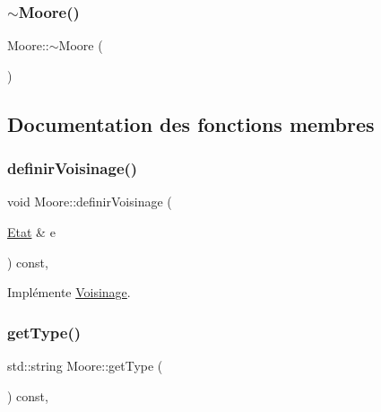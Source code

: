 \mbox{\label{class_moore_a18c2281db2524fff1559b5861cd2e3dc}} 
\subsubsection{\texorpdfstring{$\sim$\+Moore()}{~Moore()}}
{\footnotesize\ttfamily Moore\+::$\sim$\+Moore (\begin{DoxyParamCaption}{ }\end{DoxyParamCaption})\hspace{0.3cm}{\ttfamily [default]}}



\subsection{Documentation des fonctions membres}
\mbox{\label{class_moore_a29a0a8f7b132429b5cbea4fdafcfd045}} 
\subsubsection{\texorpdfstring{definir\+Voisinage()}{definirVoisinage()}}
{\footnotesize\ttfamily void Moore\+::definir\+Voisinage (\begin{DoxyParamCaption}\item[{\mbox{\hyperlink{class_etat}{Etat}} \&}]{e }\end{DoxyParamCaption}) const\hspace{0.3cm}{\ttfamily [override]}, {\ttfamily [virtual]}}



Implémente \mbox{\hyperlink{class_voisinage_ac12f70bf8e971cbc8eaf8394de270d07}{Voisinage}}.

\mbox{\label{class_moore_af0398509c1540f611c000579714fbce7}} 
\subsubsection{\texorpdfstring{get\+Type()}{getType()}}
{\footnotesize\ttfamily std\+::string Moore\+::get\+Type (\begin{DoxyParamCaption}{ }\end{DoxyParamCaption}) const\hspace{0.3cm}{\ttfamily [inline]}, {\ttfamily [virtual]}}



